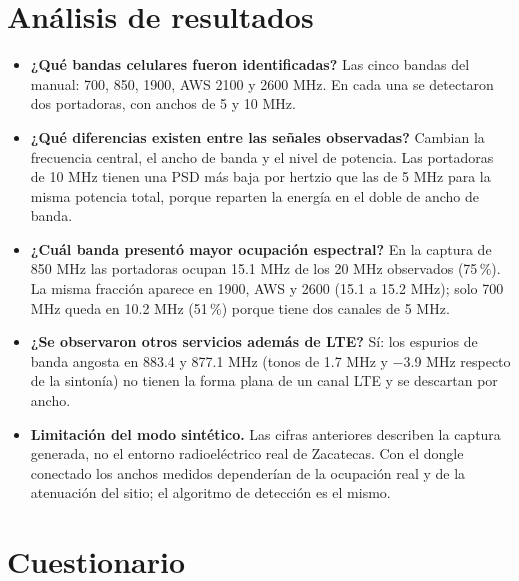 \documentclass[11pt,a4paper]{article}
\begin{document}
\section{Análisis de resultados}

\begin{itemize}
  \item \textbf{¿Qué bandas celulares fueron identificadas?} Las cinco bandas del manual:
        700, 850, 1900, AWS 2100 y 2600 MHz. En cada una se detectaron dos portadoras, con
        anchos de 5 y 10 MHz.
  \item \textbf{¿Qué diferencias existen entre las señales observadas?} Cambian la
        frecuencia central, el ancho de banda y el nivel de potencia. Las portadoras de
        10 MHz tienen una PSD más baja por hertzio que las de 5 MHz para la misma potencia
        total, porque reparten la energía en el doble de ancho de banda.
  \item \textbf{¿Cuál banda presentó mayor ocupación espectral?} En la captura de 850 MHz
        las portadoras ocupan 15.1 MHz de los 20 MHz observados (75\,\%). La misma
        fracción aparece en 1900, AWS y 2600 (15.1 a 15.2 MHz); solo 700 MHz queda en
        10.2 MHz (51\,\%) porque tiene dos canales de 5 MHz.
  \item \textbf{¿Se observaron otros servicios además de LTE?} Sí: los espurios de banda
        angosta en 883.4 y 877.1 MHz (tonos de 1.7 MHz y $-$3.9 MHz respecto de la
        sintonía) no tienen la forma plana de un canal LTE y se descartan por ancho.
  \item \textbf{Limitación del modo sintético.} Las cifras anteriores describen la captura
        generada, no el entorno radioeléctrico real de Zacatecas. Con el dongle conectado
        los anchos medidos dependerían de la ocupación real y de la atenuación del sitio;
        el algoritmo de detección es el mismo.
\end{itemize}

\section{Cuestionario}
\end{document}
